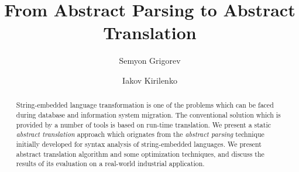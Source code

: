 \documentclass{llncs}
\begin{document}
\sloppy
%
%
%
%
%
%
\title{From Abstract Parsing to Abstract Translation}
%
%
\author{Semyon Grigorev 
\and Iakov Kirilenko
}
%
%



\maketitle              %

\begin{abstract}
String-embedded language transformation is one of the problems which can be faced during 
database and information system migration. The conventional solution which
is provided by a number of tools is based on run-time translation. We present a static 
\emph{abstract translation} approach which orignates from the \emph{abstract parsing} 
technique~\cite{AbstrParsing} initially developed for syntax analysis of string-embedded 
languages. We present abstract translation algorithm and some optimization techniques, and
discuss the results of its evaluation on a real-world industrial application.


\end{abstract}
\end{document}
